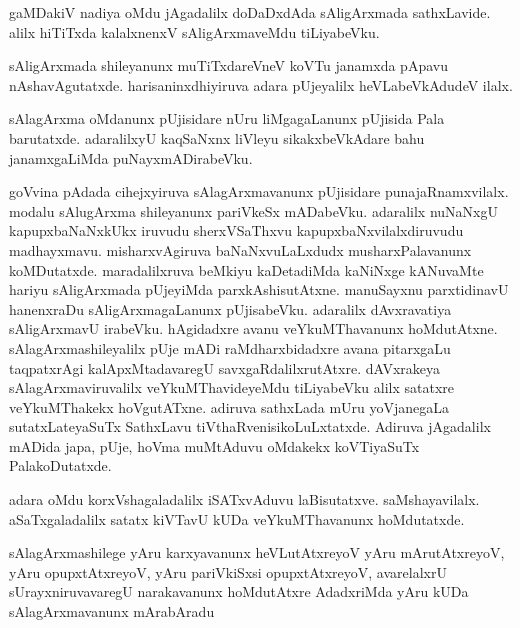 \documentclass{article}
\begin{document}
\begin{mn}%
gaMDakiV nadiya oMdu jAgadalilx doDaDxdAda sAligArxmada sathxLavide. alilx hiTiTxda 
kalalxnenxV sAligArxmaveMdu tiLiyabeVku.
\end{mn}

\begin{mn}%
sAligArxmada shileyanunx muTiTxdareVneV koVTu janamxda pApavu nAshavAgutatxde. 
harisaninxdhiyiruva adara pUjeyalilx heVLabeVkAdudeV ilalx.
\end{mn}

\begin{mn}%
sAlagArxma oMdanunx pUjisidare nUru liMgagaLanunx pUjisida Pala barutatxde. adaralilxyU 
kaqSaNxnx liVleyu sikakxbeVkAdare bahu janamxgaLiMda puNayxmADirabeVku.
\end{mn}

\begin{mn}%
goVvina pAdada cihejxyiruva sAlagArxmavanunx pUjisidare punajaRnamxvilalx. modalu 
sAlugArxma shileyanunx pariVkeSx mADabeVku. adaralilx nuNaNxgU kapupxbaNaNxkUkx iruvudu 
sherxVSaThxvu kapupxbaNxvilalxdiruvudu  madhayxmavu. misharxvAgiruva baNaNxvuLaLxdudx 
musharxPalavanunx koMDutatxde. maradalilxruva beMkiyu kaDetadiMda kaNiNxge kANuvaMte 
hariyu sAligArxmada  pUjeyiMda parxkAshisutAtxne. manuSayxnu parxtidinavU hanenxraDu 
sAligArxmagaLanunx pUjisabeVku. adaralilx dAvxravatiya sAligArxmavU irabeVku. hAgidadxre 
avanu veYkuMThavanunx hoMdutAtxne. sAlagArxmashileyalilx pUje mADi raMdharxbidadxre avana 
pitarxgaLu taqpatxrAgi kalApxMtadavaregU savxgaRdalilxrutAtxre. dAVxrakeya 
sAlagArxmaviruvalilx veYkuMThavideyeMdu tiLiyabeVku alilx satatxre veYkuMThakekx 
hoVgutATxne. adiruva sathxLada mUru yoVjanegaLa sutatxLateyaSuTx SathxLavu 
tiVthaRvenisikoLuLxtatxde. Adiruva jAgadalilx mADida japa, pUje, hoVma muMtAduvu oMdakekx 
koVTiyaSuTx PalakoDutatxde.
\end{mn}

\begin{mn}%
adara oMdu korxVshagaladalilx iSATxvAduvu laBisutatxve. saMshayavilalx. aSaTxgaladalilx 
satatx kiVTavU kUDa veYkuMThavanunx hoMdutatxde.
\end{mn}

\begin{mn}%
sAlagArxmashilege yAru karxyavanunx heVLutAtxreyoV yAru mArutAtxreyoV, yAru  
opupxtAtxreyoV, yAru pariVkiSxsi opupxtAtxreyoV, avarelalxrU sUrayxniruvavaregU 
narakavanunx hoMdutAtxre AdadxriMda yAru kUDa sAlagArxmavanunx mArabAradu
\end{mn}
\end{document}
